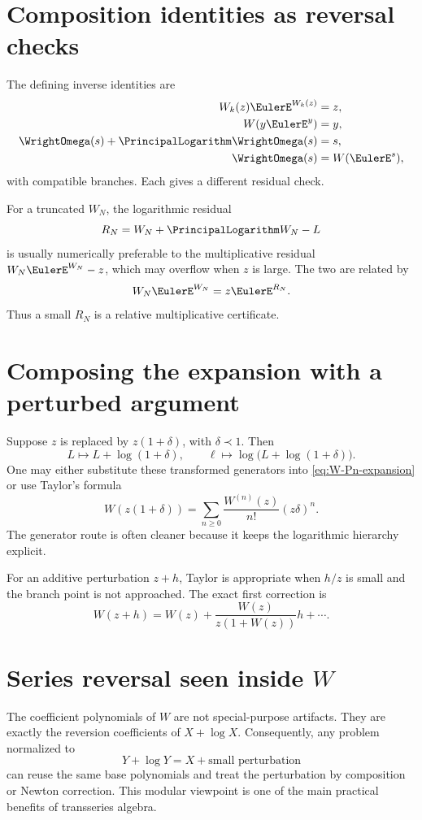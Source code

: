 \documentclass[11pt,openany]{book}
\theoremstyle{definition}
\theoremstyle{plain}
\theoremstyle{remark}
\newcommand{\precdom}{\prec}
\begin{document}
\section{Composition identities as reversal checks}
The defining inverse identities are
\begin{align}
 W_k(z)\EulerE^{W_k(z)}&=z,\label{eq:W-check1}\\
 W(y\EulerE^y)&=y,\label{eq:W-check2}\\
 \WrightOmega(s)+\PrincipalLogarithm\WrightOmega(s)&=s,\label{eq:W-check3}\\
 \WrightOmega(s)&=W(\EulerE^s),\label{eq:W-check4}
\end{align}
with compatible branches. Each gives a different residual check.

For a truncated \(W_N\), the logarithmic residual
\[
 R_N=W_N+\PrincipalLogarithm W_N-L
\]
is usually numerically preferable to the multiplicative residual \(W_N\EulerE^{W_N}-z\), which may overflow when \(z\) is large. The two are related by
\[
 W_N\EulerE^{W_N}=z \EulerE^{R_N}.
\]
Thus a small \(R_N\) is a relative multiplicative certificate.

\section{Composing the expansion with a perturbed argument}
Suppose \(z\) is replaced by \(z(1+\delta)\), with \(\delta\precdom1\). Then
\[
 L\mapsto L+\log(1+\delta),
 \qquad
 \ell\mapsto\log\bigl(L+\log(1+\delta)\bigr).
\]
One may either substitute these transformed generators into \cref{eq:W-Pn-expansion} or use Taylor's formula
\begin{equation}\label{eq:W-argument-Taylor}
 W(z(1+\delta))
 =\sum_{n\ge0}\frac{W^{(n)}(z)}{n!}(z\delta)^n.
\end{equation}
The generator route is often cleaner because it keeps the logarithmic hierarchy explicit.

For an additive perturbation \(z+h\), Taylor is appropriate when \(h/z\) is small and the branch point is not approached. The exact first correction is
\[
 W(z+h)=W(z)+\frac{W(z)}{z(1+W(z))}h+\cdots.
\]

\section{Series reversal seen inside \texorpdfstring{\(W\)}{W}}
The coefficient polynomials of \(W\) are not special-purpose artifacts. They are exactly the reversion coefficients of \(X+\log X\). Consequently, any problem normalized to
\[
 Y+\log Y=X+\text{small perturbation}
\]
can reuse the same base polynomials and treat the perturbation by composition or Newton correction. This modular viewpoint is one of the main practical benefits of transseries algebra.
\end{document}
